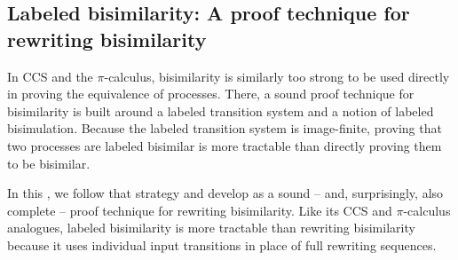 

\subsection{Labeled bisimilarity: A proof technique for rewriting bisimilarity}\label{sec:ordered-bisimilarity:labeled-bisim}

In \ac{CCS} and the $\pi$-calculus, bisimilarity is similarly too strong to be used directly in proving the equivalence of processes.
There, a sound proof technique for bisimilarity is built around a labeled transition system and a notion of labeled bisimulation.\autocite{Sangiorgi+Walker:CUP03}
Because the labeled transition system is image-finite, proving that two processes are labeled bisimilar is more tractable than directly proving them to be bisimilar.

In this , we follow that strategy and develop  as a sound -- and, surprisingly, also complete -- proof technique for rewriting bisimilarity.
Like its \ac{CCS} and $\pi$-calculus analogues, labeled bisimilarity is more tractable than rewriting bisimilarity because it uses individual input transitions in place of full rewriting sequences.

